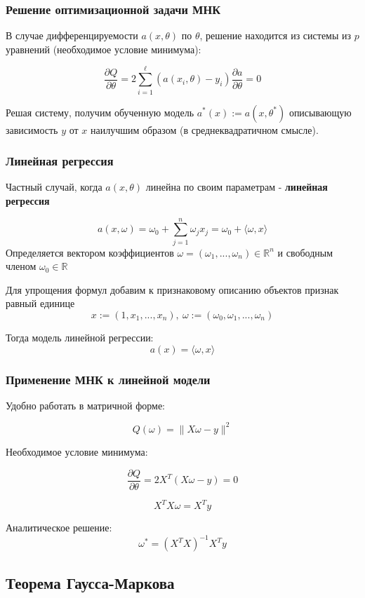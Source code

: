 \documentclass{beamer}
\begin{document}
	\begin{frame}
		\frametitle{Решение оптимизационной задачи МНК}
		В случае дифференцируемости $a(x, \theta)$ по $\theta$, решение находится из системы из $p$ уравнений (необходимое условие минимума):
		
		$$
		\frac{\partial Q}{\partial \theta} = 2 \sum_{i=1}^{\ell} (a(x_i, \theta) - y_i) \frac{\partial a}{\partial \theta} = 0
		$$
		
		\vspace{15pt}
		
		Решая систему, получим обученную модель $a^{*}(x) := a(x, \theta^{*})$ описывающую зависимость $y$ от $x$ наилучшим образом (в среднеквадратичном смысле).		
	\end{frame}
	
	
	\begin{frame}
		\frametitle{Линейная регрессия}
		
		Частный случай, когда $a(x, \theta)$ линейна по своим параметрам - \textbf{линейная регрессия}
		
		$$
		a(x, \omega) = \omega_0 + \sum_{j=1}^{n} \omega_j x_j = 
		\omega_0 + \langle \omega, x\rangle 
		$$
		Определяется вектором коэффициентов $\omega = (\omega_1, ..., \omega_n) \in \mathbb{R}^{n}$ и свободным членом $\omega_0 \in \mathbb{R}$
		
		\vspace{5pt}
		
		Для упрощения формул добавим к признаковому описанию объектов признак равный единице 
		$$x := (1, x_1, ..., x_n), \
		 \omega := (\omega_0, \omega_1, ..., \omega_{n})$$
		 
		Тогда модель линейной регрессии:
		$$
		a(x) = \langle \omega, x \rangle
		$$
	\end{frame}	

	
	\begin{frame}
		\frametitle{Применение МНК к линейной модели}
		Удобно работать в матричной форме:
		
		$$ Q(\omega) = \|X\omega - y\|^{2} $$
		
		Необходимое условие минимума:
		
		$$ \frac{\partial Q}{\partial \theta} = 2X^{T} (X\omega - y) = 0$$
		
		$$ X^{T}X\omega = X^{T}y $$
		
		Аналитическое решение:
		$$ \omega^{*} = (X^{T}X)^{-1} X^{T} y $$
	\end{frame}


	\subsection{Теорема Гаусса-Маркова}
\end{document}
